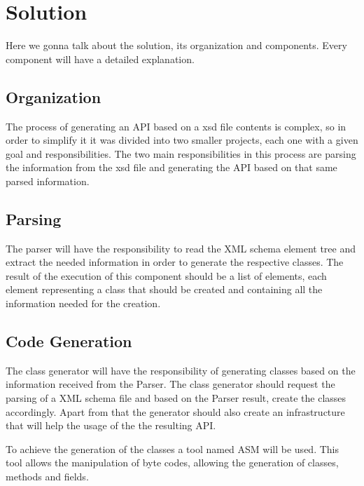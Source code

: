 \chapter{Solution}
\label{cha:solution}

Here we gonna talk about the solution, its organization and components. Every component will have a detailed explanation.

\section{Organization} %
\label{sec:organization}

The process of generating an API based on a xsd file contents is complex, so in order to simplify it it was divided into two smaller projects, each one with a given goal and responsibilities. The two main responsibilities in this process are parsing the information from the xsd file and generating the API based on that same parsed information.

\section{Parsing} %
\label{sec:parsing}


The parser will have the responsibility to read the XML schema element tree and extract the needed information in order to generate the respective classes. The result of the execution of this component should be a list of elements, each element representing a class that should be created and containing all the information needed for the creation.


\section{Code Generation} %
\label{sec:codegeneration}


The class generator will have the responsibility of generating classes based on the information received from the Parser. The class generator should request the parsing of a XML schema file and based on the Parser result, create the classes accordingly. Apart from that the generator should also create an infrastructure that will help the usage of the the resulting API. 

\noindent
To achieve the generation of the classes a tool named ASM will be used. This tool allows the manipulation of byte codes, allowing the generation of classes, methods and fields. 

